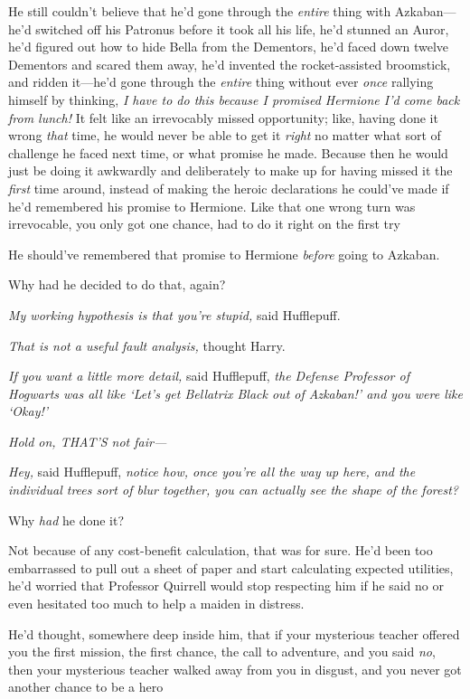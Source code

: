 He still couldn't believe that he'd gone through the \emph{entire} thing with
Azkaban—he'd switched off his Patronus before it took all his life, he'd
stunned an Auror, he'd figured out how to hide Bella from the Dementors, he'd
faced down twelve Dementors and scared them away, he'd invented the
rocket-assisted broomstick, and ridden it—he'd gone through the \emph{entire}
thing without ever \emph{once} rallying himself by thinking, \emph{I have to do
this{\el} because{\el} I promised Hermione I'd come back from lunch!} It
felt like an irrevocably missed opportunity; like, having done it wrong
\emph{that} time, he would never be able to get it \emph{right} no matter what
sort of challenge he faced next time, or what promise he made. Because then he
would just be doing it awkwardly and deliberately to make up for having missed
it the \emph{first} time around, instead of making the heroic declarations he
could've made if he'd remembered his promise to Hermione. Like that one wrong
turn was irrevocable, you only got one chance, had to do it right on the first
try{\el}

He should've remembered that promise to Hermione \emph{before} going to Azkaban.

Why had he decided to do that, again?

\emph{My working hypothesis is that you're stupid,} said Hufflepuff.

\emph{That is not a useful fault analysis,} thought Harry.

\emph{If you want a little more detail,} said Hufflepuff, \emph{the Defense
Professor of Hogwarts was all like `Let's get Bellatrix Black out of Azkaban!'
and you were like `Okay!'}

\emph{Hold on, THAT'S not fair—}

\emph{Hey,} said Hufflepuff, \emph{notice how, once you're all the way up here,
and the individual trees sort of blur together, you can actually see the shape
of the forest?}

Why \emph{had} he done it{\el}?

Not because of any cost-benefit calculation, that was for sure. He'd been too
embarrassed to pull out a sheet of paper and start calculating expected
utilities, he'd worried that Professor Quirrell would stop respecting him if he
said no or even hesitated too much to help a maiden in distress.

He'd thought, somewhere deep inside him, that if your mysterious teacher
offered you the first mission, the first chance, the call to adventure, and you
said \emph{no}, then your mysterious teacher walked away from you in disgust,
and you never got another chance to be a hero{\el}


